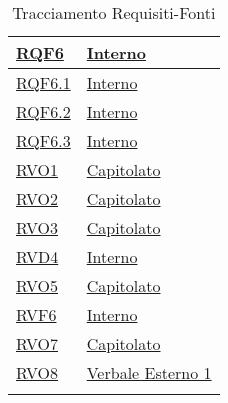\begin{longtable}{|>{\centering}m{5cm}|m{5cm}<{\centering}|}
\hyperlink{RQF6}{RQF6} & \hyperlink{Interno}{Interno}\\ \hline

\hyperlink{RQF6.1}{RQF6.1} & \hyperlink{Interno}{Interno}\\ \hline

\hyperlink{RQF6.2}{RQF6.2} & \hyperlink{Interno}{Interno}\\ \hline

\hyperlink{RQF6.3}{RQF6.3} & \hyperlink{Interno}{Interno}\\ \hline

\hyperlink{RVO1}{RVO1} & \hyperlink{Capitolato}{Capitolato}\\ \hline

\hyperlink{RVO2}{RVO2} & \hyperlink{Capitolato}{Capitolato}\\ \hline

\hyperlink{RVO3}{RVO3} & \hyperlink{Capitolato}{Capitolato}\\ \hline

\hyperlink{RVD4}{RVD4} & \hyperlink{Interno}{Interno}\\ \hline

\hyperlink{RVO5}{RVO5} & \hyperlink{Capitolato}{Capitolato}\\ \hline

\hyperlink{RVF6}{RVF6} & \hyperlink{Interno}{Interno}\\ \hline

\hyperlink{RVO7}{RVO7} & \hyperlink{Capitolato}{Capitolato}\\ \hline

\hyperlink{RVO8}{RVO8} & \hyperlink{Verbale Esterno 1}{Verbale Esterno 1}\\ \hline

\caption[Tracciamento Requisiti-Fonti]{Tracciamento Requisiti-Fonti}
\label{tabella:requi-fonti}
\end{longtable}
\clearpage
